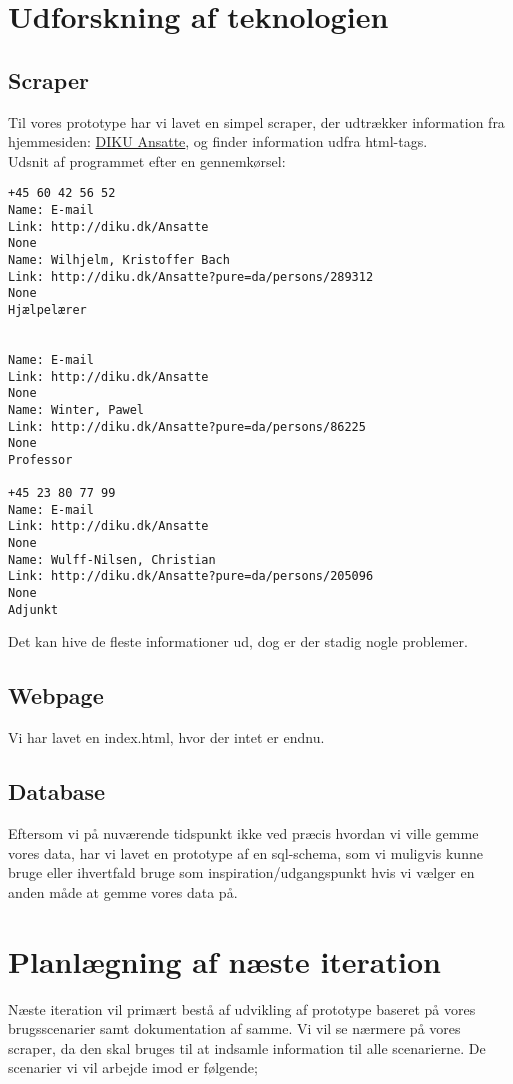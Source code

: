 \documentclass[11pt]{article}
\begin{document}
\section{Udforskning af teknologien}
\subsection{Scraper}
Til vores prototype har vi lavet en simpel scraper, der udtrækker information fra hjemmesiden: \href{http://www.diku.dk/Ansatte}{DIKU Ansatte}, og finder information udfra html-tags. \\
Udsnit af programmet efter en gennemkørsel:
\begin{verbatim}
+45 60 42 56 52
Name: E-mail
Link: http://diku.dk/Ansatte
None
Name: Wilhjelm, Kristoffer Bach
Link: http://diku.dk/Ansatte?pure=da/persons/289312
None
Hjælpelærer


Name: E-mail
Link: http://diku.dk/Ansatte
None
Name: Winter, Pawel
Link: http://diku.dk/Ansatte?pure=da/persons/86225
None
Professor

+45 23 80 77 99
Name: E-mail
Link: http://diku.dk/Ansatte
None
Name: Wulff-Nilsen, Christian
Link: http://diku.dk/Ansatte?pure=da/persons/205096
None
Adjunkt
\end{verbatim}
Det kan hive de fleste informationer ud, dog er der stadig nogle problemer.
\subsection{Webpage}
Vi har lavet en index.html, hvor der intet er endnu.
\subsection{Database}
Eftersom vi på nuværende tidspunkt ikke ved præcis hvordan vi ville gemme vores data, har vi lavet en prototype af en sql-schema, som vi muligvis kunne bruge eller ihvertfald bruge som inspiration/udgangspunkt hvis vi vælger en anden måde at gemme vores data på.
\section{Planlægning af næste iteration}
Næste iteration vil primært bestå af udvikling af prototype baseret på vores brugsscenarier samt dokumentation af samme. Vi vil se nærmere på vores scraper, da den skal bruges til at indsamle information til alle scenarierne.
De scenarier vi vil arbejde imod er følgende;
\end{document}
